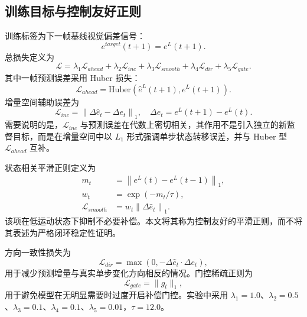 \documentclass[journal]{IEEEtran}
\newcommand{\legacy}{e^{L}}
\newcommand{\uhat}{\hat{e}^{L}}
\newcommand{\dhat}{\Delta\hat{e}}
\begin{document}
\subsection{训练目标与控制友好正则}
训练标签为下一帧基线视觉偏差信号：
\begin{equation}
e^{target}(t+1)=\legacy(t+1).
\end{equation}
总损失定义为
\begin{equation}
\mathcal{L}=\lambda_1\mathcal{L}_{ahead}+\lambda_2\mathcal{L}_{inc}+\lambda_3\mathcal{L}_{smooth}+\lambda_4\mathcal{L}_{dir}+\lambda_5\mathcal{L}_{gate}.
\end{equation}
其中一帧预测误差采用 Huber 损失：
\begin{equation}
\mathcal{L}_{ahead}=\mathrm{Huber}\!\left(\uhat(t+1),\legacy(t+1)\right).
\end{equation}
增量空间辅助误差为
\begin{equation}
\mathcal{L}_{inc}=\left\|\dhat_t-\Delta e_t\right\|_1,\quad
\Delta e_t=\legacy(t+1)-\legacy(t).
\end{equation}
需要说明的是，$\mathcal{L}_{inc}$ 与预测误差在代数上密切相关，其作用不是引入独立的新监督目标，而是在增量空间中以 $L_1$ 形式强调单步状态转移误差，并与 Huber 型 $\mathcal{L}_{ahead}$ 互补。

状态相关平滑正则定义为
\begin{equation}
\begin{aligned}
m_t&=\left\|\legacy(t)-\legacy(t-1)\right\|_1,\\
w_t&=\exp(-m_t/\tau),\\
\mathcal{L}_{smooth}&=w_t\left\|\dhat_t\right\|_1.
\end{aligned}
\end{equation}
该项在低运动状态下抑制不必要补偿。本文将其称为控制友好的平滑正则，而不将其表述为严格闭环稳定性证明。

方向一致性损失为
\begin{equation}
\mathcal{L}_{dir}=\max\left(0,-\dhat_t\cdot\Delta e_t\right),
\end{equation}
用于减少预测增量与真实单步变化方向相反的情况。门控稀疏正则为
\begin{equation}
\mathcal{L}_{gate}=\|g_t\|_1,
\end{equation}
用于避免模型在无明显需要时过度开启补偿门控。实验中采用 $\lambda_1=1.0$、$\lambda_2=0.5$、$\lambda_3=0.1$、$\lambda_4=0.1$、$\lambda_5=0.01$，$\tau=12.0$。
\end{document}
